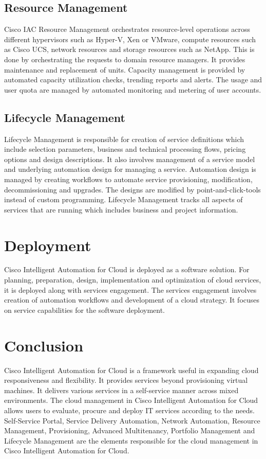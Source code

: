 \documentclass[9pt,twocolumn,twoside]{../../styles/osajnl}
\begin{document}
\subsection{Resource Management}

Cisco IAC Resource Management orchestrates resource-level operations
across different hypervisors such as Hyper-V, Xen or VMware, compute
resources such as Cisco UCS, network resources and storage resources
such as NetApp. This is done by orchestrating the requests to domain
resource managers. It provides maintenance and replacement of
units. Capacity management is provided by automated capacity
utilization checks, trending reports and alerts. The usage and user
quota are managed by automated monitoring and metering of user
accounts.

\subsection{Lifecycle Management}

Lifecycle Management is responsible for creation of service
definitions which include selection parameters, business and technical
processing flows, pricing options and design descriptions. It also
involves management of a service model and underlying automation
design for managing a service. Automation design is managed by
creating workflows to automate service provisioning, modification,
decommissioning and upgrades. The designs are modified by
point-and-click-tools instead of custom programming. Lifecycle
Management tracks all aspects of services that are running which
includes business and project information.

\section{Deployment}

Cisco Intelligent Automation for Cloud is deployed as a software
solution. For planning, preparation, design, implementation and
optimization of cloud services, it is deployed along with services
engagement. The services engagement involves creation of automation
workflows and development of a cloud strategy. It focuses on service
capabilities for the software deployment.

\section{Conclusion}

Cisco Intelligent Automation for Cloud is a framework useful in
expanding cloud responsiveness and flexibility. It provides services
beyond provisioning virtual machines. It delivers various services in
a self-service manner across mixed environments. The cloud management
in Cisco Intelligent Automation for Cloud allows users to evaluate,
procure and deploy IT services according to the needs. Self-Service
Portal, Service Delivery Automation, Network Automation, Resource
Management, Provisioning, Advanced Multitenancy, Portfolio Management
and Lifecycle Management are the elements responsible for the cloud
management in Cisco Intelligent Automation for Cloud.
\end{document}
